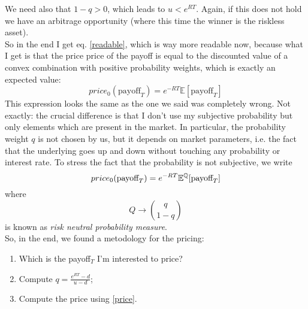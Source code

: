We need also that $1-q>0$, which leads to $u<e^{RT}$. Again, if this does not hold we have an arbitrage opportunity (where this time the winner is the riskless asset). \\
So in the end I get eq. \eqref{readable}, which is way more readable now, because what I get is that the price price of the payoff is equal to the discounted value of a convex combination with positive probability weights, which is exactly an expected value:
\begin{equation}
    price_0(\mbox{payoff}_T) = e^{-RT}\mathbb{E}[\mbox{payoff}_T]
\end{equation}
This expression looks the same as the one we said was completely wrong. Not exactly: the crucial difference is that I don't use my subjective probability but only elements which are present in the market. In particular, the probability weight $q$ is not chosen by us, but it depends on market parameters, i.e. the fact that the underlying goes up and down without touching any probability or interest rate. To stress the fact that the probability is not subjective, we write
\begin{equation}\label{price}
    price_0(\mbox{payoff}_T) = e^{-RT}\mathbb{E}^{\mathbb{Q}}[\mbox{payoff}_T]
\end{equation}
where 
\begin{equation}
    Q \to \binom{q}{1-q}
\end{equation}
is known as \emph{risk neutral probability measure}.\\
So, in the end, we found a metodology for the pricing:
\begin{enumerate}
    \item Which is the payoff$_T$ I'm interested to price?
    \item Compute $q = \frac{e^{RT}-d}{u-d}$;
    \item Compute the price using \eqref{price}.
\end{enumerate}


